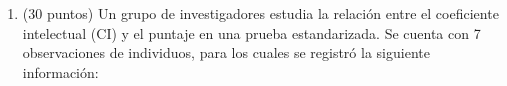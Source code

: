 \documentclass[10pt,a4paper]{article}
\begin{document}
\begin{enumerate}




\item (30 puntos) Un grupo de investigadores estudia la relación entre el coeficiente intelectual (CI) y el puntaje en una prueba estandarizada. Se cuenta con 7 observaciones de individuos, para los cuales se registró la siguiente información:


\end{enumerate}
\end{document}
